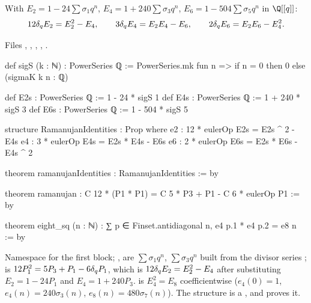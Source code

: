 \begin{theorem}\label{l25:thm:ramanujan}
With $E_2=1-24\sum\sigma_1q^n$, $E_4=1+240\sum\sigma_3q^n$, $E_6=1-504\sum\sigma_5q^n$ in $\Q[[q]]$:
\begin{equation*}
12\delta_q E_2=E_2^2-E_4,\qquad 3\delta_q E_4=E_2E_4-E_6,\qquad 2\delta_q E_6=E_2E_6-E_4^2 .
\end{equation*}
\end{theorem}
\noindent Files ,
, ,
, .
\begin{leancode}
def sigS (k : ℕ) : PowerSeries ℚ := PowerSeries.mk fun n => if n = 0 then 0 else (sigmaK k n : ℚ)

def E2s : PowerSeries ℚ := 1 - 24 * sigS 1
def E4s : PowerSeries ℚ := 1 + 240 * sigS 3
def E6s : PowerSeries ℚ := 1 - 504 * sigS 5

structure RamanujanIdentities : Prop where
  e2 : 12 * eulerOp E2s = E2s ^ 2 - E4s
  e4 : 3 * eulerOp E4s = E2s * E4s - E6s
  e6 : 2 * eulerOp E6s = E2s * E6s - E4s ^ 2

theorem ramanujanIdentities : RamanujanIdentities := by
\end{leancode}
\begin{leancode}
theorem ramanujan : C 12 * (P1 * P1) = C 5 * P3 + P1 - C 6 * eulerOp P1 := by

theorem eight_sq (n : ℕ) :
    ∑ p ∈ Finset.antidiagonal n, e4 p.1 * e4 p.2 = e8 n := by
\end{leancode}
\begin{dictionary}
Namespace  for the first block; ,  are
$\sum\sigma_1q^n$, $\sum\sigma_3q^n$ built from the divisor series ;  is
$12P_1^2=5P_3+P_1-6\delta_q P_1$, which is $12\delta_q E_2=E_2^2-E_4$ after substituting $E_2=1-24P_1$ and
$E_4=1+240P_3$.  is $E_4^2=E_8$ coefficientwise ($e_4(0)=1$, $e_4(n)=240\sigma_3(n)$, $e_8(n)=480\sigma_7(n)$).
The structure  is a , and  proves it.
\end{dictionary}
